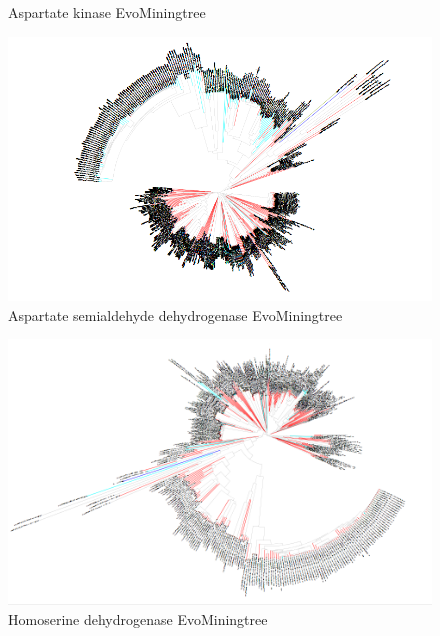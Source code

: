\documentclass[12pt,twoside]{reedthesis}
\begin{document}
\begin{figure}[h!tbp]
  \caption[Aspartate kinase EvoMiningtree]{\normalsize{Aspartate kinase EvoMiningtree}}
  \label{fig:Aspartate_kinase_evo_tree}
  \end{figure}\begin{figure}[h!tbp]
  \centering
  \includegraphics[angle = 180,scale = 0.25]{chapter2/Cyanobacteria/tree19.png}
  \caption[Aspartate semialdehyde dehydrogenase EvoMiningtree]{\normalsize{Aspartate semialdehyde dehydrogenase EvoMiningtree}}
  \label{fig:Aspartate_semialdehyde_dehydrogenase_evo_tree}
  \end{figure}\begin{figure}[h!tbp]
  \centering
  \includegraphics[angle = 180,scale = 0.25]{chapter2/Cyanobacteria/tree20.png}
  \caption[Homoserine dehydrogenase EvoMiningtree]{\normalsize{Homoserine dehydrogenase EvoMiningtree}}
  \label{fig:Homoserine_dehydrogenase_evo_tree}
  \end{figure}
  
  \clearpage 
  
\end{document}
